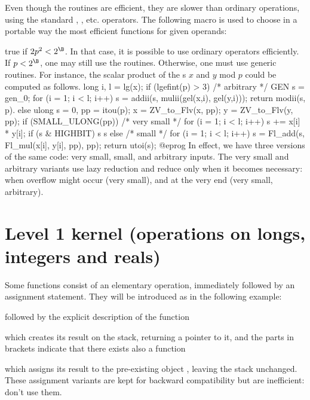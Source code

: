 Even though the  routines are efficient, they are slower than
ordinary  operations, using the standard \kbd{+}, \kbd{\%}, etc.
operators.
The following macro is used to choose in a portable way the most efficient
functions for given operands:

 true if $2p^2 <2^\B$. In that case, it is
possible to use ordinary operators efficiently. If $p < 2^\B$, one
may still use the  routines. Otherwise, one must use generic
routines. For instance, the scalar product of the s $x$ and $y$ mod
$p$ could be computed as follows.
\bprog
    long i, l = lg(x);
    if (lgefint(p) > 3)
    { /* arbitrary */
      GEN s = gen_0;
      for (i = 1; i < l; i++) s = addii(s, mulii(gel(x,i), gel(y,i)));
      return modii(s, p).
    }
    else
    {
      ulong s = 0, pp = itou(p);
      x = ZV_to_Flv(x, pp);
      y = ZV_to_Flv(y, pp);
      if (SMALL_ULONG(pp))
      { /* very small */
        for (i = 1; i < l; i++)
        {
          s += x[i] * y[i];
          if (s & HIGHBIT) s %
        }
        s %
      }
      else
      { /* small */
        for (i = 1; i < l; i++)
          s = Fl_add(s, Fl_mul(x[i], y[i], pp), pp);
      }
      return utoi(s);
    }
@eprog\noindent
In effect, we have three versions of the same code: very small, small, and
arbitrary inputs. The very small and arbitrary variants use lazy reduction
and reduce only when it becomes necessary: when overflow might occur (very
small), and at the very end (very small, arbitrary).

\section{Level 1 kernel (operations on longs, integers and reals)}

 Some functions consist of an elementary operation,
immediately followed by an assignment statement. They will be introduced as
in the following example:

 followed by the explicit
description of the function


\noindent which creates its result on the stack, returning a  pointer
to it, and the parts in brackets indicate that there exists also a function


\noindent which assigns its result to the pre-existing object
, leaving the stack unchanged. These assignment variants are kept for
backward compatibility but are inefficient: don't use them.

